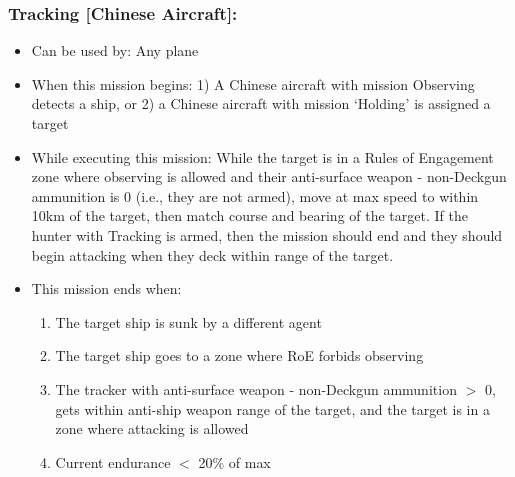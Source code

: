 \documentclass{article}
\begin{document}
    \subsubsection{Tracking [Chinese Aircraft]:}
            \begin{itemize}
                \item{Can be used by:} Any plane
                \item{When this mission begins:} 1) A Chinese aircraft with mission Observing detects a ship, or 2) a Chinese aircraft with mission `Holding' is assigned a target
                \item{While executing this mission:} While the target is in a Rules of Engagement zone where observing is allowed and their anti-surface weapon - non-Deckgun ammunition is 0 (i.e., they are not armed), move at max speed to within 10km of the target, then match course and bearing of the target. If the hunter with Tracking is armed, then the mission should end and they should begin attacking when they deck within range of the target.
                \item{This mission ends when:} 
                \begin{enumerate}[label=\arabic*)]
                    \item The target ship is sunk by a different agent \par
                    [hunter resumes player-assigned mission]
                    \item The target ship goes to a zone where RoE forbids observing \par
                    [hunter resumes player-assigned mission]
                    \item The tracker with anti-surface weapon - non-Deckgun ammunition $>$ 0, gets within anti-ship weapon range of the target, and the target is in a zone where attacking is allowed \par
                    [hunter begins attacking]
                    \item Current endurance $<$ 20\% of max \par
                    [hunter transits to base]
                \end{enumerate}
            \end{itemize}
\end{document}

